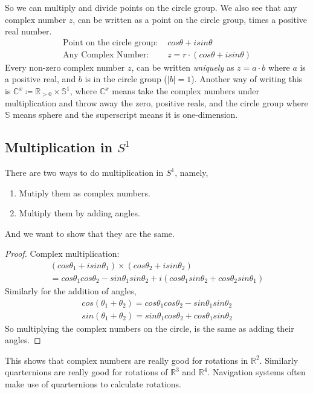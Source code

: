 \documentclass{article}
\begin{document}
So we can multiply and divide points on the circle group. We also see that
any complex number $z$, can be written as a point on the circle group,
times a positive real number.
\begin{align*}
	\text{Point on the circle group: } & cos\theta + isin\theta               \\
	\text{Any Complex Number: }        & z = r \cdot (cos\theta + isin\theta)
\end{align*}
Every non-zero complex number $z$, can be written \textit{uniquely} as
$z = a \cdot b$ where $a$ is a positive real, and $b$ is in the circle group ($|b| = 1$).
Another way of writing this is $\mathbb{C}^{x} \coloneqq \mathbb{R}_{>0} \times \mathbb{S}^{1}$, where
$\mathbb{C}^{x}$ means take the complex numbers under multiplication and throw away the zero, positive
reals, and the circle group where $\mathbb{S}$ means sphere and the superscript means it is one-dimension.

\subsection{Multiplication in $S^1$}
There are two ways to do multiplication in $S^1$, namely,
\begin{enumerate}
	\item Mutiply them as complex numbers.
	\item Multiply them by adding angles.
\end{enumerate}
And we want to show that they are the same.
\begin{proof}
	Complex multiplication:
	\begin{gather*}
		(cos\theta_1+isin\theta_1) \times (cos\theta_2+isin\theta_2) \\
		= cos\theta_1 cos\theta_2 - sin\theta_1 sin\theta_2 + i(cos\theta_1 sin\theta_2 + cos\theta_2 sin\theta_1)
	\end{gather*}
	Similarly for the addition of angles,
	\begin{gather*}
		cos(\theta_1 + \theta_2) = cos\theta_1 cos\theta_2 - sin\theta_1 sin\theta_2 \\
		sin(\theta_1 + \theta_2) = sin\theta_1 cos\theta_2 + cos\theta_1 sin\theta_2
	\end{gather*}
	So multiplying the complex numbers on the circle, is the same as adding their angles.
\end{proof}
\noindent This shows that complex numbers are really good for rotations in $\mathbb{R}^2$. Similarly
quarternions are really good for rotations of $\mathbb{R}^3$ and $\mathbb{R}^4$. Navigation systems
often make use of quarternions to calculate rotations.
\end{document}
